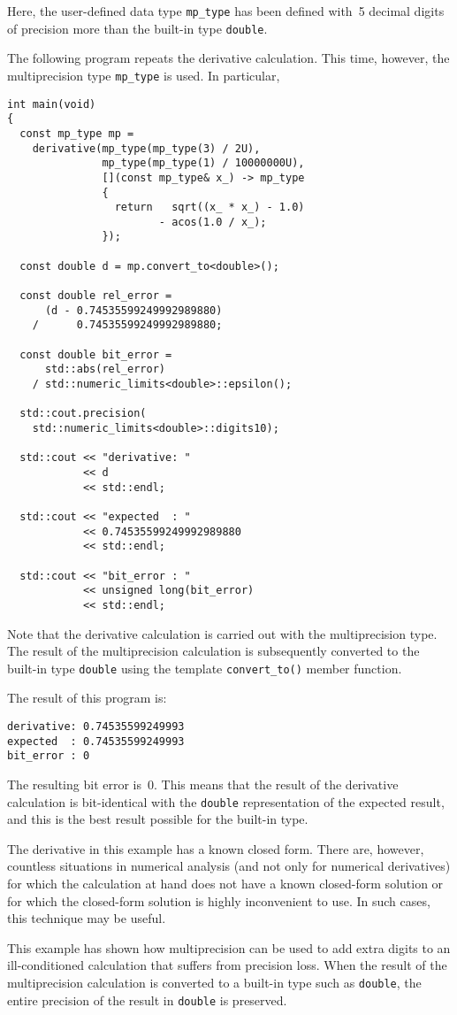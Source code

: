 \documentclass{article}[10pt]
\begin{document}
Here, the user-defined data type {\lstinline|mp_type|}
has been defined with~5 decimal digits of precision
more than the built-in type {\lstinline|double|}.

The following program repeats the derivative calculation.
This time, however, the multiprecision type {\lstinline|mp_type|}
is used. In particular,

\begin{lstlisting}
int main(void)
{
  const mp_type mp =
    derivative(mp_type(mp_type(3) / 2U),
               mp_type(mp_type(1) / 10000000U),
               [](const mp_type& x_) -> mp_type
               {
                 return   sqrt((x_ * x_) - 1.0)
                        - acos(1.0 / x_);
               });

  const double d = mp.convert_to<double>();

  const double rel_error =
      (d - 0.74535599249992989880)
    /      0.74535599249992989880;

  const double bit_error = 
      std::abs(rel_error)
    / std::numeric_limits<double>::epsilon();

  std::cout.precision(
    std::numeric_limits<double>::digits10);

  std::cout << "derivative: "
            << d
            << std::endl;

  std::cout << "expected  : "
            << 0.74535599249992989880
            << std::endl;

  std::cout << "bit_error : "
            << unsigned long(bit_error)
            << std::endl;
\end{lstlisting}

Note that the derivative calculation is carried out
with the multiprecision type. The result of the
multiprecision calculation is subsequently converted to
the built-in type {\lstinline|double|} using the
template {\lstinline|convert_to()|} member function.

The result of this program is:

\begin{lstlisting}
derivative: 0.74535599249993
expected  : 0.74535599249993
bit_error : 0
\end{lstlisting}

The resulting bit error is~0. This means that
the result of the derivative calculation is bit-identical
with the {\lstinline|double|} representation of the
expected result, and this is the best result possible
for the built-in type.

The derivative in this example has a known closed form.
There are, however, countless situations in numerical
analysis (and not only for numerical derivatives)
for which the calculation at hand does not have a known
closed-form solution or for which the closed-form solution
is highly inconvenient to use. In such cases, this technique
may be useful.

This example has shown how multiprecision can be used
to add extra digits to an ill-conditioned calculation
that suffers from precision loss. When the result of the
multiprecision calculation is converted to a built-in type
such as {\lstinline|double|}, the entire precision of the
result in {\lstinline|double|} is preserved.
\end{document}
